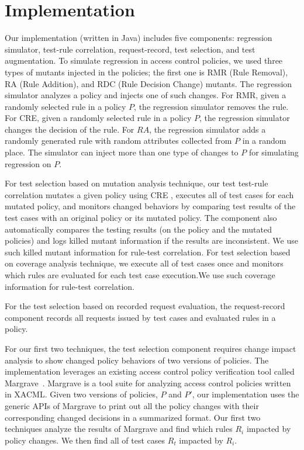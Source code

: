 \section{Implementation} \label{sec:implementation}

Our implementation (written in Java) includes five components: regression simulator, test-rule correlation, request-record, test selection,
and test augmentation. To simulate regression in access control policies, 
we used three types of mutants injected in the policies; the first one
is RMR (Rule Removal), RA (Rule Addition), and RDC (Rule Decision Change)
mutants. The regression simulator analyzes a policy and injects one
of such changes. For RMR, given a randomly selected rule in a policy $P$,
the regression simulator removes the rule. For CRE,
given a randomly selected rule in a policy $P$, the regression simulator changes
the decision of the rule.
For $RA$, the regression simulator adds a randomly generated
rule with random attributes collected from $P$ in a random place.
The simulator can inject more than one type of changes to $P$ for simulating
regression on $P$.

For test selection based on mutation analysis technique,
our test test-rule correlation mutates a given policy using CRE
, executes all of test cases for each mutated policy, and monitors changed
behaviors by comparing test results of the test cases with an original policy or its mutated policy.
The component also automatically compares the testing results (on the policy and the mutated
policies) and logs killed mutant information if the results are inconsistent. We use
such killed mutant information for rule-test correlation.
For test selection based on coverage analysis technique,
we execute  all of test cases once and monitors
which rules are evaluated for each test case execution.We use such
coverage information for rule-test correlation.

For the test selection based on recorded request evaluation,
the request-record component records all requests issued by test cases and evaluated rules in a policy.

For our first two techniques, the test selection component requires change impact analysis to
show changed policy behaviors of two versions of policies.
The implementation leverages an existing access control policy verification tool called Margrave~\cite{fisler05:verification}. Margrave is a tool suite for analyzing access control policies written in XACML.
Given two versions of policies, $P$ and $P'$, 
our implementation uses the generic APIs of Margrave to
print out all the policy changes with their corresponding changed decisions in a summarized format.
Our first two techniques analyze the results of Margrave and
find which rules $R_i$ impacted by policy changes. We then find all of test cases $R_t$
impacted by $R_i$.

